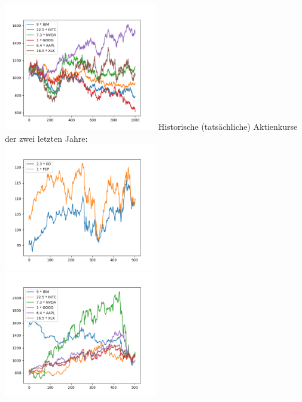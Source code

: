 \documentclass[12pt]{article}
\begin{document}
	\includegraphics[width=0.5\textwidth]{Teil2_2}
	Historische (tatsächliche) Aktienkurse der zwei letzten Jahre:
	\\
	\includegraphics[width=0.5\textwidth]{Teil1_hist_2y}	
	\includegraphics[width=0.5\textwidth]{Teil2_hist_2y}	
	
	
	
\end{document}
